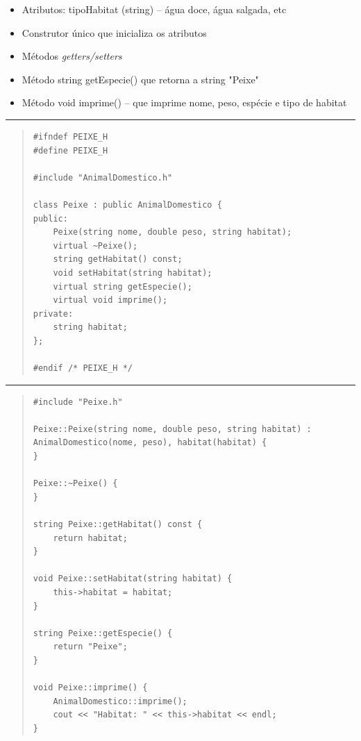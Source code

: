 \documentclass[12pt]{article}
\begin{document}
\begin{itemize}

\item Atributos: tipoHabitat ({\sf string}) -- água doce, água salgada, etc

\item Construtor único que inicializa os atributos       

\item Métodos {\it getters/setters}

\item Método {\sf string getEspecie()} que retorna a string "Peixe"

\item Método {\sf void imprime()} -- que imprime nome, peso, espécie e tipo de habitat

\end{itemize}

\par\noindent\rule{\textwidth}{0.4pt}

\begin{quote}
\begin{scriptsize}
\begin{verbatim}
#ifndef PEIXE_H
#define PEIXE_H

#include "AnimalDomestico.h"

class Peixe : public AnimalDomestico {
public:
    Peixe(string nome, double peso, string habitat);
    virtual ~Peixe();
    string getHabitat() const;
    void setHabitat(string habitat);
    virtual string getEspecie();
    virtual void imprime();
private:
    string habitat;
};

#endif /* PEIXE_H */
\end{verbatim}
\end{scriptsize}
\end{quote}

\par\noindent\rule{\textwidth}{0.4pt}

\begin{quote}
\begin{scriptsize}
\begin{verbatim}
#include "Peixe.h"

Peixe::Peixe(string nome, double peso, string habitat) :
AnimalDomestico(nome, peso), habitat(habitat) {
}

Peixe::~Peixe() {
}

string Peixe::getHabitat() const {
    return habitat;
}

void Peixe::setHabitat(string habitat) {
    this->habitat = habitat;
}

string Peixe::getEspecie() {
    return "Peixe";
}

void Peixe::imprime() {
    AnimalDomestico::imprime();
    cout << "Habitat: " << this->habitat << endl;
}
\end{verbatim}
\end{scriptsize}
\end{quote}
\end{document}

